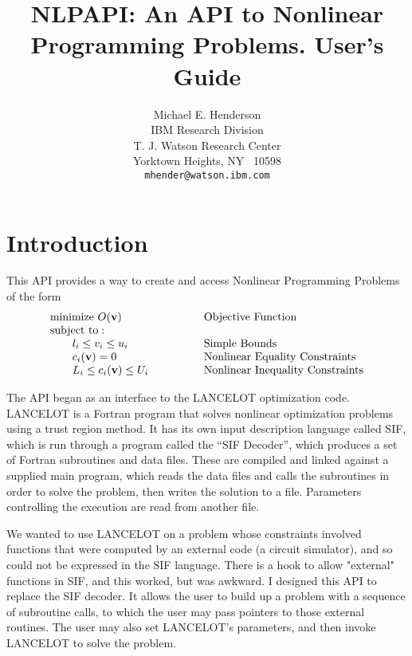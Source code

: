 \documentclass[12pt]{article}
\title{NLPAPI: An API to Nonlinear Programming Problems. {\bf User's Guide}}
\author{
  Michael E. Henderson\\[.5\baselineskip]
  IBM Research Division\\
  T. J. Watson Research Center\\
  Yorktown Heights, NY ~10598\\
  {\tt mhender@watson.ibm.com}
 }
\begin{document}
  \maketitle

   \section{Introduction}

    This API provides a way to create and access Nonlinear Programming Problems of the
    form 
    \begin{displaymath}
     \begin{array}{ll}
      {\rm minimize}~O({\bf v})& \qquad\qquad \rm Objective~Function\\
      {\rm subject~to:}\\
      \qquad l_i \leq v_i \leq u_i& \qquad\qquad  \rm Simple~Bounds\\
      \qquad c_i({\bf v}) = 0& \qquad\qquad \rm Nonlinear~Equality
                                                      ~Constraints\\
      \qquad L_i \leq c_i({\bf v}) \leq U_i& \qquad\qquad \rm Nonlinear
                                                      ~Inequality~Constraints\\
     \end{array}
    \end{displaymath}

     The API began as an interface to the LANCELOT optimization code.
    LANCELOT is a Fortran program that solves nonlinear optimization 
    problems using a trust region method. It has its own input description language called SIF, 
    which is run through a program called the ``SIF Decoder'', which 
    produces a set of Fortran subroutines and data files. 
    These are compiled and linked against a supplied main program,
    which reads the data files and calls the subroutines
    in order to solve the problem, then writes the solution to a file.
    Parameters controlling the execution are read from another file.

    We wanted to use LANCELOT on a problem whose constraints involved functions
    that were computed by an external code (a circuit simulator), and so could
    not be expressed in the SIF language. There is a hook to allow "external"
    functions in SIF, and this worked, but was awkward. I designed this API to
    replace the SIF decoder. It allows the user to build up a problem
    with a sequence of subroutine calls, to which the user may pass pointers 
    to those external routines. The user may also set LANCELOT's parameters, and
    then invoke LANCELOT to solve the problem.
\end{document}
